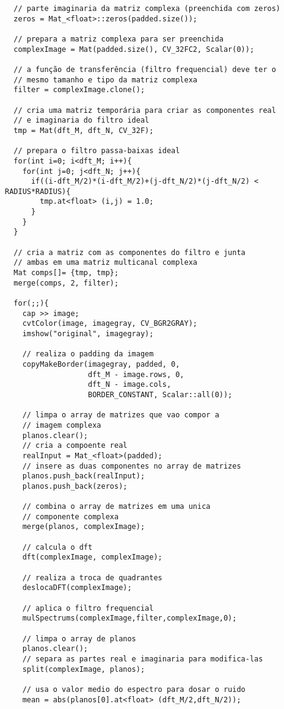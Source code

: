 \documentclass[11pt]{amsbook}
\begin{document}
\begin{verbatim}
  // parte imaginaria da matriz complexa (preenchida com zeros)
  zeros = Mat_<float>::zeros(padded.size());

  // prepara a matriz complexa para ser preenchida
  complexImage = Mat(padded.size(), CV_32FC2, Scalar(0));

  // a função de transferência (filtro frequencial) deve ter o
  // mesmo tamanho e tipo da matriz complexa
  filter = complexImage.clone();

  // cria uma matriz temporária para criar as componentes real
  // e imaginaria do filtro ideal
  tmp = Mat(dft_M, dft_N, CV_32F);

  // prepara o filtro passa-baixas ideal
  for(int i=0; i<dft_M; i++){
    for(int j=0; j<dft_N; j++){
      if((i-dft_M/2)*(i-dft_M/2)+(j-dft_N/2)*(j-dft_N/2) < RADIUS*RADIUS){
        tmp.at<float> (i,j) = 1.0;
      }
    }
  }

  // cria a matriz com as componentes do filtro e junta
  // ambas em uma matriz multicanal complexa
  Mat comps[]= {tmp, tmp};
  merge(comps, 2, filter);

  for(;;){
    cap >> image;
    cvtColor(image, imagegray, CV_BGR2GRAY);
    imshow("original", imagegray);

    // realiza o padding da imagem
    copyMakeBorder(imagegray, padded, 0,
                   dft_M - image.rows, 0,
                   dft_N - image.cols,
                   BORDER_CONSTANT, Scalar::all(0));

    // limpa o array de matrizes que vao compor a
    // imagem complexa
    planos.clear();
    // cria a compoente real
    realInput = Mat_<float>(padded);
    // insere as duas componentes no array de matrizes
    planos.push_back(realInput);
    planos.push_back(zeros);

    // combina o array de matrizes em uma unica
    // componente complexa
    merge(planos, complexImage);

    // calcula o dft
    dft(complexImage, complexImage);

    // realiza a troca de quadrantes
    deslocaDFT(complexImage);

    // aplica o filtro frequencial
    mulSpectrums(complexImage,filter,complexImage,0);

    // limpa o array de planos
    planos.clear();
    // separa as partes real e imaginaria para modifica-las
    split(complexImage, planos);

    // usa o valor medio do espectro para dosar o ruido
    mean = abs(planos[0].at<float> (dft_M/2,dft_N/2));


\end{verbatim}
\end{document}
